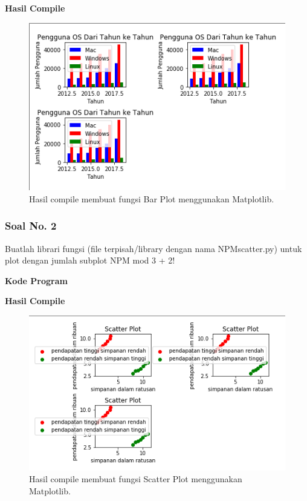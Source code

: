 

\hfill \break
\textbf{Hasil Compile}

\begin{figure}[H]
	\includegraphics[width=12cm]{figures/6/Praktek/1174038/p1.png}
	\centering
	\caption{Hasil compile membuat fungsi Bar Plot menggunakan Matplotlib.}
\end{figure}

\subsubsection{Soal No. 2}
\hfill \break
Buatlah librari fungsi (file terpisah/library dengan nama NPMscatter.py) untuk plot dengan jumlah subplot NPM mod 3 + 2!

\hfill \break
\textbf{Kode Program}



\hfill \break
\textbf{Hasil Compile}

\begin{figure}[H]
	\includegraphics[width=12cm]{figures/6/Praktek/1174038/p2.png}
	\centering
	\caption{Hasil compile membuat fungsi Scatter Plot menggunakan Matplotlib.}
\end{figure}

